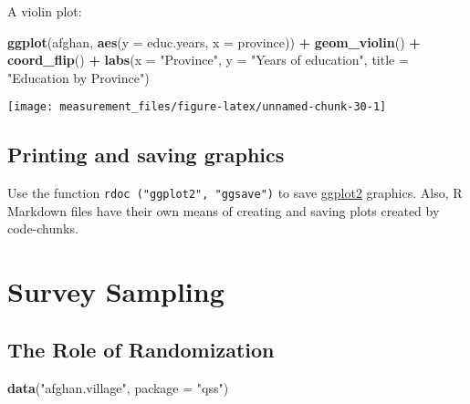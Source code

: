 \documentclass[]{book}
\newenvironment{Shaded}{\begin{snugshade}}{\end{snugshade}}
\newcommand{\DataTypeTok}[1]{\textcolor[rgb]{0.13,0.29,0.53}{#1}}
\newcommand{\KeywordTok}[1]{\textcolor[rgb]{0.13,0.29,0.53}{\textbf{#1}}}
\newcommand{\NormalTok}[1]{#1}
\newcommand{\OperatorTok}[1]{\textcolor[rgb]{0.81,0.36,0.00}{\textbf{#1}}}
\newcommand{\StringTok}[1]{\textcolor[rgb]{0.31,0.60,0.02}{#1}}
\theoremstyle{definition}
\theoremstyle{definition}
\theoremstyle{definition}
\theoremstyle{remark}
\begin{document}
A violin plot:

\begin{Shaded}
\begin{Highlighting}[]
\KeywordTok{ggplot}\NormalTok{(afghan, }\KeywordTok{aes}\NormalTok{(}\DataTypeTok{y =}\NormalTok{ educ.years, }\DataTypeTok{x =}\NormalTok{ province)) }\OperatorTok{+}
\StringTok{  }\KeywordTok{geom_violin}\NormalTok{() }\OperatorTok{+}
\StringTok{  }\KeywordTok{coord_flip}\NormalTok{() }\OperatorTok{+}
\StringTok{  }\KeywordTok{labs}\NormalTok{(}\DataTypeTok{x =} \StringTok{"Province"}\NormalTok{, }\DataTypeTok{y =} \StringTok{"Years of education"}\NormalTok{,}
       \DataTypeTok{title =} \StringTok{"Education by Province"}\NormalTok{)}
\end{Highlighting}
\end{Shaded}

\begin{center}\texttt{[image: measurement\_files/figure-latex/unnamed-chunk-30-1]} \end{center}

\hypertarget{printing-and-saving-graphics}{%
\subsection{Printing and saving
graphics}\label{printing-and-saving-graphics}}

Use the function \texttt{rdoc\ ("ggplot2",\ "ggsave")} to save
\href{https://cran.r-project.org/package=ggplot2}{ggplot2} graphics.
Also, R Markdown files have their own means of creating and saving plots
created by code-chunks.

\hypertarget{survey-sampling}{%
\section{Survey Sampling}\label{survey-sampling}}

\hypertarget{the-role-of-randomization}{%
\subsection{The Role of Randomization}\label{the-role-of-randomization}}

\begin{Shaded}
\begin{Highlighting}[]
\KeywordTok{data}\NormalTok{(}\StringTok{"afghan.village"}\NormalTok{, }\DataTypeTok{package =} \StringTok{"qss"}\NormalTok{)}
\end{Highlighting}
\end{Shaded}
\end{document}
